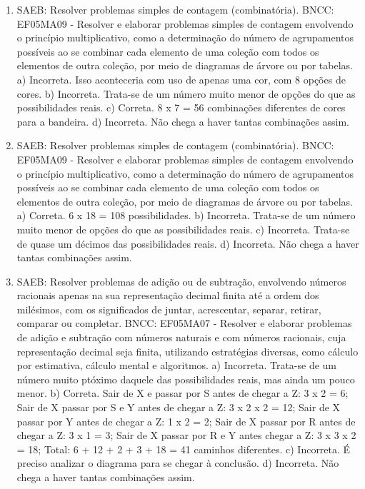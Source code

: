 \begin{enumerate}
\item
SAEB: Resolver problemas simples de contagem (combinatória).
BNCC: EF05MA09 - Resolver e elaborar problemas simples de contagem envolvendo o princípio
multiplicativo, como a determinação do número de agrupamentos possíveis ao se combinar
cada elemento de uma coleção com todos os elementos de outra coleção, por meio de
diagramas de árvore ou por tabelas.
a) Incorreta. Isso aconteceria com uso de apenas uma cor, com 8 opções de cores.
b) Incorreta. Trata-se de um número muito menor de opções do que as possibilidades reais.
c) Correta. 8 x 7 = 56 combinações diferentes de cores para a bandeira.
d) Incorreta. Não chega a haver tantas combinações assim.

\item
SAEB: Resolver problemas simples de contagem (combinatória).
BNCC: EF05MA09 - Resolver e elaborar problemas simples de contagem envolvendo o princípio
multiplicativo, como a determinação do número de agrupamentos possíveis ao se combinar
cada elemento de uma coleção com todos os elementos de outra coleção, por meio de
diagramas de árvore ou por tabelas.
a) Correta. 6 x 18 = 108 possibilidades.
b) Incorreta. Trata-se de um número muito menor de opções do que as possibilidades reais.
c) Incorreta. Trata-se de quase um décimos das possibilidades reais.
d) Incorreta. Não chega a haver tantas combinações assim.

\item
SAEB: Resolver problemas de adição ou de subtração, envolvendo números racionais apenas na sua representação decimal finita até a ordem dos milésimos, com os significados de juntar, acrescentar, separar, retirar, comparar ou completar.
BNCC: EF05MA07 - Resolver e elaborar problemas de adição e subtração com números naturais e
com números racionais, cuja representação decimal seja finita, utilizando estratégias diversas,
como cálculo por estimativa, cálculo mental e algoritmos.
a) Incorreta. Trata-se de um número muito ptóximo daquele das possibilidades reais, mas ainda um pouco menor.
b) Correta. 
Sair de X e passar por S antes de chegar a Z: 3 x 2 = 6;
Sair de X passar por S e Y antes de chegar a Z: 3 x 2 x 2 = 12;
Sair de X passar por Y antes de chegar a Z: 1 x 2 = 2;
Sair de X passar por R antes de chegar a Z: 3 x 1 = 3;
Sair de X passar por R e Y antes chegar a Z: 3 x 3 x 2 = 18;
Total: 6 + 12 + 2 + 3 + 18 = 41 caminhos diferentes.
c) Incorreta. É preciso analizar o diagrama para se chegar à conclusão.
d) Incorreta. Não chega a haver tantas combinações assim.
\end{enumerate}

